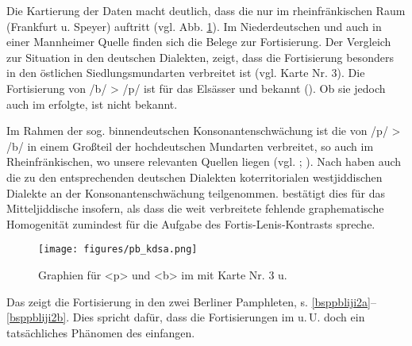   
  Die Kartierung der Daten macht deutlich, dass die  nur im rheinfränkischen Raum (Frankfurt u. Speyer) auftritt (vgl. Abb. \ref{kartebpkdsa}). Im Niederdeutschen und auch in einer Mannheimer Quelle finden sich die Belege zur Fortisierung. Der Vergleich zur Situation in den deutschen Dialekten, zeigt, dass die Fortisierung besonders in den östlichen Siedlungsmundarten verbreitet ist (vgl.  Karte Nr. 3).  Die Fortisierung von /b/ > /p/ ist für das Elsässer  und  bekannt (\cite[353,  356]{Bin-Nun1973}). Ob sie jedoch auch im  erfolgte, ist nicht bekannt.
  
  Im Rahmen der sog. binnendeutschen Konsonantenschwächung ist die  von /p/ > /b/  in einem Großteil der hochdeutschen Mundarten verbreitet, so auch im Rheinfränkischen, wo unsere relevanten Quellen liegen (vgl. \cite[330–346]{Schirmunski1962}; \cite[148f]{Koenig1978}). Nach \textcite[221]{Klepsch2004} haben auch die zu den entsprechenden deutschen Dialekten koterritorialen westjiddischen Dialekte an der Konsonantenschwächung teilgenommen. \textcite[298–303]{Timm1987} bestätigt dies für das Mitteljiddische insofern, als dass die weit verbreitete fehlende graphematische Homogenität zumindest für die Aufgabe des Fortis-Lenis-Kontrasts spreche. \\
   
  \begin{figure}[h!]
		\centering
\texttt{[image: figures/pb\_kdsa.png]}
		\caption{\label{kartebpkdsa} Graphien für <p> und <b> im  mit  Karte Nr. 3 u. \textcite[148]{Koenig1978}}
		\end{figure}
\FloatBarrier
 
 
Das  zeigt die Fortisierung in den zwei Berliner Pamphleten, s. \ref{bsppbliji2a}--\ref{bsppbliji2b}. Dies spricht dafür, dass die Fortisierungen im  u.\,U. doch ein tatsächliches Phänomen des  einfangen.\\





